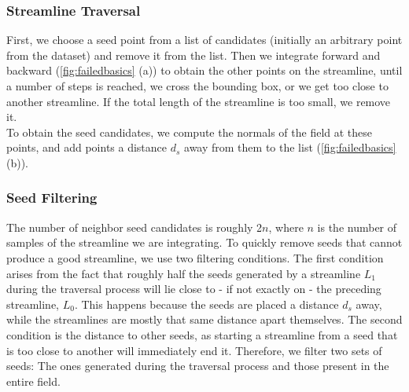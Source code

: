 \subsubsection{Streamline Traversal}
First, we choose a seed point from a list of candidates (initially an arbitrary point from the dataset) and remove it from the list.
Then we integrate forward and backward (\cref{fig:failedbasics} (a)) to obtain the other points on the streamline,
until a number of steps is reached, we cross the bounding box, or we get too close to another streamline.
If the total length of the streamline is too small, we remove it.\\
To obtain the seed candidates, we compute the normals of the field at these points, and add points a distance $d_s$ away from them to the list (\cref{fig:failedbasics} (b)).
\subsubsection{Seed Filtering}
The number of neighbor seed candidates is roughly 2$n$, where $n$ is the number of samples of the streamline we are integrating.
To quickly remove seeds that cannot produce a good streamline, we use two filtering conditions.
The first condition arises from the fact that roughly half the seeds generated by a streamline $L_1$ during the traversal process will lie close to - if not exactly on - the preceding streamline, $L_0$.
This happens because the seeds are placed a distance $d_s$ away, 
while the streamlines are mostly that same distance apart themselves.
The second condition is the distance to other seeds,
as starting a streamline from a seed that is too close to another will immediately end it.
Therefore, we filter two sets of seeds: The ones generated during the traversal process and those present in the entire field.
